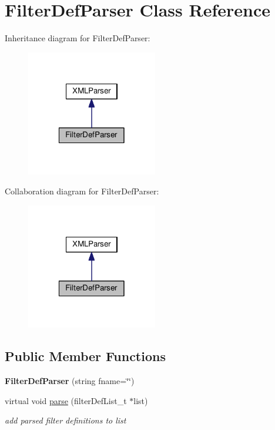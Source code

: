 \hypertarget{classFilterDefParser}{}\section{Filter\+Def\+Parser Class Reference}
\label{classFilterDefParser}


Inheritance diagram for Filter\+Def\+Parser\+:
\nopagebreak
\begin{figure}[H]
\begin{center}
\leavevmode
\includegraphics[width=162pt]{classFilterDefParser__inherit__graph}
\end{center}
\end{figure}


Collaboration diagram for Filter\+Def\+Parser\+:
\nopagebreak
\begin{figure}[H]
\begin{center}
\leavevmode
\includegraphics[width=162pt]{classFilterDefParser__coll__graph}
\end{center}
\end{figure}
\subsection*{Public Member Functions}
\begin{DoxyCompactItemize}
\item 
\mbox{\label{classFilterDefParser_a3109e15681a4a9bcaaf9bef009ad34e6}} 
{\bfseries Filter\+Def\+Parser} (string fname=\char`\"{}\char`\"{})
\item 
\mbox{\label{classFilterDefParser_a14269618b595162814ac5c62a98f3c36}} 
virtual void \hyperlink{classFilterDefParser_a14269618b595162814ac5c62a98f3c36}{parse} (filter\+Def\+List\+\_\+t $\ast$list)
\begin{DoxyCompactList}\small\item\em add parsed filter definitions to list \end{DoxyCompactList}\end{DoxyCompactItemize}
